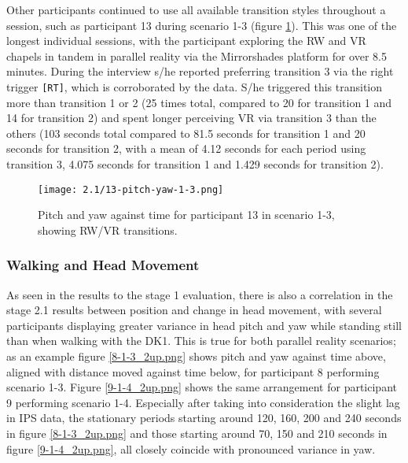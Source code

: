 \newpage

Other participants continued to use all available transition styles throughout a session, such as participant 13 during scenario 1-3 (figure \ref{13-pitch-yaw-1-3.png}). This was one of the longest individual sessions, with the participant exploring the RW and VR chapels in tandem in parallel reality via the Mirrorshades platform for over 8.5 minutes. During the interview s/he reported preferring transition 3 via the right trigger \texttt{[RT]}, which is corroborated by the data. S/he triggered this transition more than transition 1 or 2 (25 times total, compared to 20 for transition 1 and 14 for transition 2) and spent longer perceiving VR via transition 3 than the others (103 seconds total compared to 81.5 seconds for transition 1 and 20 seconds for transition 2, with a mean of 4.12 seconds for each period using transition 3, 4.075 seconds for transition 1 and 1.429 seconds for transition 2).

\begin{figure} [h]
	\begin{center}
	\texttt{[image: 2.1/13-pitch-yaw-1-3.png]}
	\caption{Pitch and yaw against time for participant 13 in scenario 1-3, showing RW/VR transitions.}
	\label{13-pitch-yaw-1-3.png}
	\end{center}
\end{figure}


\newpage

\subsubsection{Walking and Head Movement}

As seen in the results to the stage 1 evaluation, there is also a correlation in the stage 2.1 results between position and change in head movement, with several participants displaying greater variance in head pitch and yaw while standing still than when walking with the DK1. This is true for both parallel reality scenarios; as an example figure \ref{8-1-3_2up.png} shows pitch and yaw against time above, aligned with distance moved against time below, for participant 8 performing scenario 1-3. Figure \ref{9-1-4_2up.png} shows the same arrangement for participant 9 performing scenario 1-4. Especially after taking into consideration the slight lag in IPS data, the stationary periods starting around 120, 160, 200 and 240 seconds in figure \ref{8-1-3_2up.png} and those starting around 70, 150 and 210 seconds in figure \ref{9-1-4_2up.png}, all closely coincide with pronounced variance in yaw.

